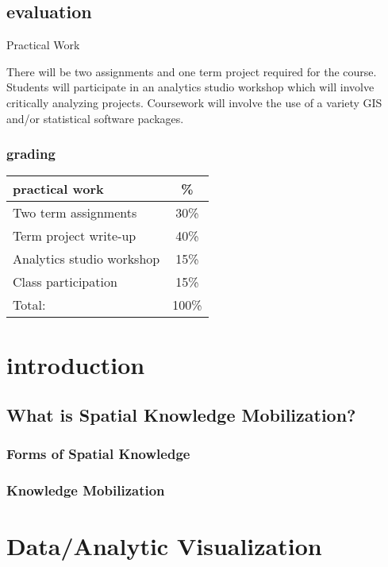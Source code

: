 \documentclass[
]{book}
\begin{document}
\hypertarget{evaluation}{%
\section{evaluation}\label{evaluation}}

Practical Work

There will be two assignments and one term project required for the course. Students will participate in an analytics studio workshop which will involve critically analyzing projects. Coursework will involve the use of a variety GIS and/or statistical software packages.

\hypertarget{grading}{%
\subsection{grading}\label{grading}}

\begin{longtable}[]{@{}lc@{}}
\toprule
practical work & \%\tabularnewline
\midrule
\endhead
Two term assignments & 30\%\tabularnewline
Term project write-up & 40\%\tabularnewline
Analytics studio workshop & 15\%\tabularnewline
Class participation & 15\%\tabularnewline
Total: & 100\%\tabularnewline
\bottomrule
\end{longtable}

\hypertarget{intro}{%
\chapter{introduction}\label{intro}}

\hypertarget{what-is-spatial-knowledge-mobilization}{%
\section{What is Spatial Knowledge Mobilization?}\label{what-is-spatial-knowledge-mobilization}}

\hypertarget{forms-of-spatial-knowledge}{%
\subsection{Forms of Spatial Knowledge}\label{forms-of-spatial-knowledge}}

\hypertarget{knowledge-mobilization}{%
\subsection{Knowledge Mobilization}\label{knowledge-mobilization}}

\hypertarget{dataanalytic-visualization}{%
\chapter{Data/Analytic Visualization}\label{dataanalytic-visualization}}
\end{document}
